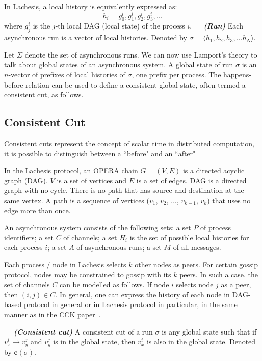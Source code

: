 \documentclass{article}
\newcommand{\dfnn}[2]{$\quad$ \textbf{\emph{(#1)}} {#2}}
\renewcommand{\vec}[1]{\mathbf{#1}}
\begin{document}
In Lachesis, a local history is equivalently expressed as:
$$h_i = g_0^i, g_1^i, g_2^i, g_3^i, \dots$$
where $g_j^i$ is the $j$-th local DAG (local state) of the process $i$.
\dfnn{Run}{Each asynchronous run is a vector of local histories. Denoted by
	$\sigma = \langle h_1,h_2,h_3,...h_N \rangle$.}

Let $\Sigma$ denote the set of asynchronous runs. We can now use Lamport’s theory to talk about global states of an asynchronous system. A global state of run $\sigma$ is an $n$-vector of prefixes of local histories of $\sigma$, one prefix per process. The happens-before relation can be used to define a consistent global state, often termed a consistent cut, as follows.

\subsection{Consistent Cut} 

Consistent cuts represent the concept of scalar time in distributed computation, it is possible to distinguish between a ``before" and an ``after"

In the Lachesis protocol, an OPERA chain $G=(V, E)$ is a directed acyclic graph (DAG). $V$ is a set of vertices and $E$ is a set of edges. DAG is a directed graph with no cycle. There is no path that has source and destination at the same vertex.
A path is a sequence of vertices ($v_1$, $v_2$, ..., $v_{k-1}$, $v_k$) that uses no edge more than once. 

An asynchronous system consists of the following sets: a set $P$ of process identifiers; a set $C$ of channels; a set $H_i$ is the set of possible local histories for each process $i$; a set $A$ of asynchronous runs; a set $M$ of all messages.

Each process / node in Lachesis selects $k$ other nodes as peers. 
For certain gossip protocol, nodes may be constrained to gossip with its $k$ peers. In such a case, the set of channels $C$ can be modelled as follows.
If node $i$ selects node $j$ as a peer, then $(i,j) \in C$. In general, one can express the history of each node in DAG-based protocol in general or in Lachesis protocol in particular, in the same manner as in the CCK paper~\cite{cck92}.


\dfnn{Consistent cut}{A consistent cut of a run $\sigma$ is any global state such that if $v_x^i \rightarrow v_y^j$ and $v_y^j$ is in the global state, then $v_x^i$ is also in the global state. Denoted by $\vec{c}(\sigma)$.}
\end{document}
